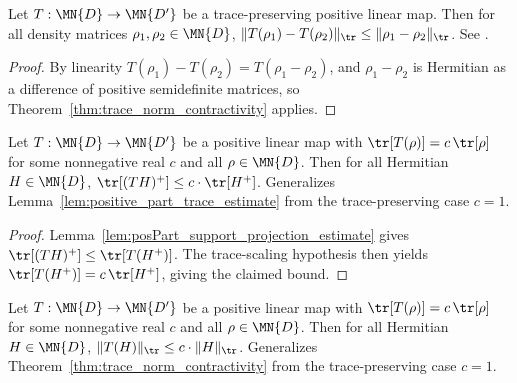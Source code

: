 \begin{corollary}
    \label{cor:trace_norm_contractivity_states}
    \leanok
    Let $T:\MN{D}\to\MN{D'}$ be a trace-preserving positive linear map.
    Then for all density matrices $\rho_1,\rho_2\in\MN{D}$,
    $\lVert T(\rho_1)-T(\rho_2)\rVert_{\tr}
    \leq\lVert\rho_1-\rho_2\rVert_{\tr}$.
    See \cite[Chapter~8, Eq.~(8.80)]{Wolf2012Quantum}.
\end{corollary}

\begin{proof}\leanok
    By linearity $T(\rho_1)-T(\rho_2)=T(\rho_1-\rho_2)$, and
    $\rho_1-\rho_2$ is Hermitian as a difference of positive semidefinite
    matrices, so Theorem~\ref{thm:trace_norm_contractivity} applies.
\end{proof}

\begin{lemma}
    \label{lem:scaled_posPart_trace_estimate}
    \leanok
    Let $T:\MN{D}\to\MN{D'}$ be a positive linear map with
    $\tr[T(\rho)] = c\,\tr[\rho]$ for some nonnegative real $c$ and
    all $\rho\in\MN{D}$. Then for all Hermitian $H\in\MN{D}$,
    $\tr[(TH)^+]\leq c\cdot\tr[H^+]$.
    Generalizes Lemma~\ref{lem:positive_part_trace_estimate} from the
    trace-preserving case $c=1$.
\end{lemma}

\begin{proof}\leanok
    Lemma~\ref{lem:posPart_support_projection_estimate} gives
    $\tr[(TH)^+]\leq\tr[T(H^+)]$.  The trace-scaling hypothesis then
    yields $\tr[T(H^+)] = c\,\tr[H^+]$, giving the claimed bound.
\end{proof}

\begin{theorem}
    \label{thm:scaled_trace_norm_contractivity}
    \leanok
    Let $T:\MN{D}\to\MN{D'}$ be a positive linear map with
    $\tr[T(\rho)] = c\,\tr[\rho]$ for some nonnegative real $c$ and
    all $\rho\in\MN{D}$. Then for all Hermitian $H\in\MN{D}$,
    $\lVert T(H)\rVert_{\tr}\leq c\cdot\lVert H\rVert_{\tr}$.
    Generalizes Theorem~\ref{thm:trace_norm_contractivity} from the
    trace-preserving case $c=1$.
\end{theorem}

